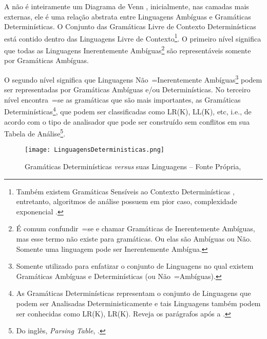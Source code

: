 A  não é inteiramente um Diagrama de Venn \cite{generalizedVennDiagrams},
inicialmente,
nas camadas mais externas,
ele é uma relação abstrata entre Linguagens Ambíguas e
Gramáticas Determinísticas.
O Conjunto das Gramáticas Livre de Contexto Determinísticas está contido dentro das Linguagens Livre de Contexto\footnote{
Também existem Gramáticas Sensíveis ao Contexto Determinísticas \cite{contextSensitiveParsing},
entretanto,
algoritmos de análise possuem em pior caso,
complexidade exponencial \cite{areContextSensitiveGrammarWithPolynomialTime}.
}.
O primeiro nível significa que todas as Linguagens Inerentemente Ambíguas\footnote{
É comum confundir~=se e
chamar Gramáticas de Inerentemente Ambíguas,
mas esse termo não existe para gramáticas.
Ou elas são Ambíguas ou
Não.
Somente uma linguagem pode ser Inerentemente Ambígua.
}
são representáveis somente por Gramáticas Ambíguas.

O segundo nível significa que Linguagens Não~=Inerentemente Ambíguas\footnote{
Somente utilizado para enfatizar o conjunto de Linguagens no qual existem Gramáticas Ambíguas e
Determinísticas (ou Não~=Ambíguas).
}
podem ser representadas por Gramáticas Ambíguas e\slash{}ou Determinísticas.
No terceiro nível encontra~=se as gramáticas que são mais importantes,
as Gramáticas Determinísticas\footnote{
As Gramáticas Determinísticas representam o conjunto de Linguagens que podem ser Analisadas Deterministicamente e
tais Linguagens também podem ser conhecidas como LR(K),
LR(K).
Reveja os parágrafos após a .
},
que podem ser classificadas como LR(K),
LL(K), etc, i.e.,
de acordo com o tipo de analisador que pode ser construído sem conflitos em sua Tabela de Análise\footnote{
Do inglês, \textit{Parsing Table},
\cite{ahoCompilerDragonBook}.
}.
\begin{figure}[h]
\centering
\texttt{[image: LinguagensDeterministicas.png]}
\caption[Gramáticas Determinísticas \textit{versus} suas Linguagens]{Gramáticas Determinísticas \textit{versus} suas Linguagens -- Fonte Própria,
}
\label{LinguagensDeterministicas}
\end{figure}

